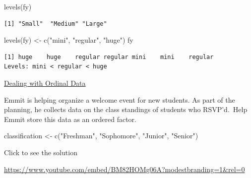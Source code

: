 \documentclass[
  letterpaper,
  DIV=11,
  numbers=noendperiod]{scrreprt}
\newenvironment{Shaded}{\begin{snugshade}}{\end{snugshade}}
\newcommand{\FunctionTok}[1]{\textcolor[rgb]{0.28,0.35,0.67}{#1}}
\newcommand{\NormalTok}[1]{\textcolor[rgb]{0.00,0.23,0.31}{#1}}
\newcommand{\OtherTok}[1]{\textcolor[rgb]{0.00,0.23,0.31}{#1}}
\newcommand{\StringTok}[1]{\textcolor[rgb]{0.13,0.47,0.30}{#1}}
\begin{document}
\begin{Shaded}
\begin{Highlighting}[]
\FunctionTok{levels}\NormalTok{(fy)}
\end{Highlighting}
\end{Shaded}

\begin{verbatim}
[1] "Small"  "Medium" "Large" 
\end{verbatim}

\begin{Shaded}
\begin{Highlighting}[]
\FunctionTok{levels}\NormalTok{(fy) }\OtherTok{\textless{}{-}} \FunctionTok{c}\NormalTok{(}\StringTok{"mini"}\NormalTok{, }\StringTok{"regular"}\NormalTok{, }\StringTok{"huge"}\NormalTok{)}
\NormalTok{fy}
\end{Highlighting}
\end{Shaded}

\begin{verbatim}
[1] huge    huge    regular regular mini    mini    regular
Levels: mini < regular < huge
\end{verbatim}

\begin{watch}{}{}
    \href{https://youtu.be/_PfBPa3GQWM}{Dealing with Ordinal Data}
\end{watch}

\begin{tcolorbox}[enhanced jigsaw, colbacktitle=quarto-callout-tip-color!10!white, breakable, bottomrule=.15mm, colframe=quarto-callout-tip-color-frame, left=2mm, opacitybacktitle=0.6, title=\textcolor{quarto-callout-tip-color}{\faLightbulb}\hspace{0.5em}{Try it Out}, leftrule=.75mm, opacityback=0, rightrule=.15mm, titlerule=0mm, bottomtitle=1mm, colback=white, toprule=.15mm, arc=.35mm, toptitle=1mm, coltitle=black]

Emmit is helping organize a welcome event for new students. As part of
the planning, he collects data on the class standings of students who
RSVP'd.~Help Emmit store this data as an ordered factor.

\begin{Shaded}
\begin{Highlighting}[]
\NormalTok{classification }\OtherTok{\textless{}{-}} \FunctionTok{c}\NormalTok{(}\StringTok{"Freshman"}\NormalTok{, }\StringTok{"Sophomore"}\NormalTok{, }\StringTok{"Junior"}\NormalTok{, }\StringTok{"Senior"}\NormalTok{)}
\end{Highlighting}
\end{Shaded}

Click to see the solution

\url{https://www.youtube.com/embed/BM82HOMg06A?modestbranding=1&rel=0}

\end{tcolorbox}
\end{document}
